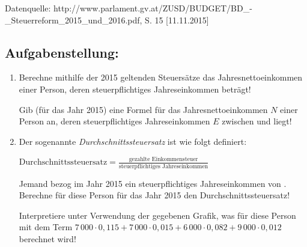 \begin{langesbeispiel}
\begin{center}
\end{center}
\begin{tiny}\begin{singlespace}  Datenquelle:  http://www.parlament.gv.at/ZUSD/BUDGET/BD\_-\_Steuerreform\_2015\_und\_2016.pdf, S. 15 [11.11.2015]\end{singlespace}\end{tiny}


\subsection{Aufgabenstellung:}
\begin{enumerate}
	\item {} Berechne mithilfe der 2015 geltenden Steuersätze das Jahresnettoeinkommen einer Person, deren steuerpflichtiges Jahreseinkommen  beträgt!
	
	Gib (für das Jahr 2015) eine Formel für das Jahresnettoeinkommen $N$ einer Person an, deren steuerpflichtiges Jahreseinkommen $E$ zwischen  und  liegt!
	
	\item Der sogenannte \textit{Durchschnittssteuersatz} ist wie folgt definiert:
	
	$\text{Durchschnittssteuersatz}=\frac{\text{gezahlte Einkommensteuer}}{\text{steuerpflichtiges Jahreseinkommen}}$
	
	Jemand bezog im Jahr 2015 ein steuerpflichtiges Jahreseinkommen von . Berechne für diese Person für das Jahr 2015 den Durchschnittssteuersatz! 
 
Interpretiere unter Verwendung der gegebenen Grafik, was für diese Person mit dem Term $7\,000\cdot 0,115+7\,000\cdot 0,015+6\,000\cdot 0,082+9\,000\cdot 0,012$ berechnet wird!


\end{enumerate}
\end{langesbeispiel}
